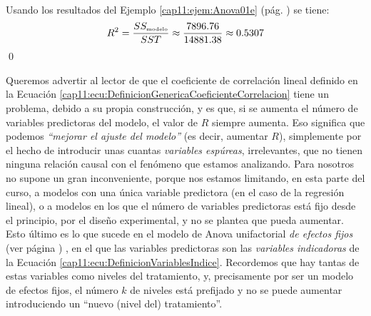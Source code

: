     \\[3mm]

\begin{ejemplo}
\label{cap11:ejem:CoeficienteCorrelacionAnovaFrailecillos}

Usando los resultados del Ejemplo \ref{cap11:ejem:Anova01e} (pág. \pageref{cap11:ejem:Anova01e}) se
tiene:
\[R^2=\dfrac{SS_{\mbox{\tiny modelo}}}{SST}\approx
\dfrac{7896.76}{14881.38}\approx 0.5307
\]
\qed
\end{ejemplo}
Queremos advertir al lector de que el coeficiente de correlación lineal definido en la Ecuación
\ref{cap11:ecu:DefinicionGenericaCoeficienteCorrelacion} tiene un problema, debido a su propia
construcción, y es que, si se aumenta el número de variables predictoras del modelo, el valor de
$R$ siempre aumenta. Eso significa que podemos {\em ``mejorar el ajuste del modelo''} (es decir,
aumentar $R$), simplemente por el hecho de introducir unas cuantas {\em variables espúreas},
irrelevantes, que no tienen ninguna relación causal con el fenómeno que estamos analizando. Para
nosotros no supone un gran inconveniente, porque nos estamos limitando, en esta parte del curso, a
modelos con una única variable predictora (en el caso de la regresión lineal), o a modelos en los
que el número de variables predictoras está fijo desde el principio, por el diseño experimental, y
no se plantea que pueda aumentar. Esto último es lo que sucede en el modelo de Anova unifactorial
{\em de efectos fijos} (ver página
\pageref{cap11:subsubsec:AnovaUnifactorialCompletamenteAleatorioEfectosFijos}) , en el que las
variables predictoras son las {\em variables indicadoras} de la Ecuación
\ref{cap11:ecu:DefinicionVariablesIndice}. Recordemos que hay tantas de estas variables como
niveles del tratamiento, y, precisamente por ser un modelo de efectos fijos, el número $k$ de
niveles está prefijado y no se puede aumentar introduciendo un ``nuevo (nivel del) tratamiento''.

